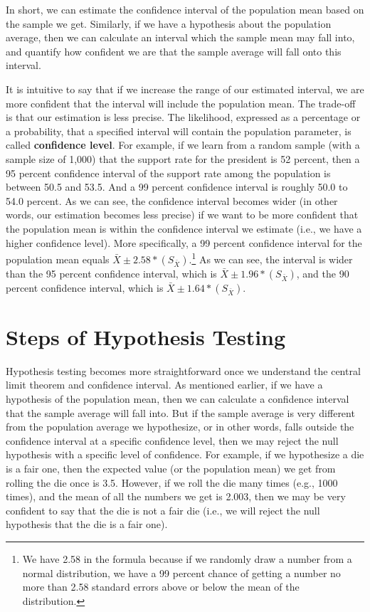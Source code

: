 \documentclass{book}
\begin{document}
In short, we can estimate the confidence interval of the population mean based
on the sample we get. Similarly, if we have a hypothesis about the population
average, then we can calculate an interval which the sample mean may fall
into, and quantify how confident we are that the sample average will fall onto
this interval.

It is intuitive to say that if we increase the range of our estimated
interval, we are more confident that the interval will include the population
mean. The trade-off is that our estimation is less precise. The likelihood,
expressed as a percentage or a probability, that a specified interval will
contain the population parameter, is called \textbf{confidence level}. For
example, if we learn from a random sample (with a sample size of 1,000) that
the support rate for the president is 52 percent, then a 95 percent confidence
interval of the support rate among the population is between 50.5 and 53.5.
And a 99 percent confidence interval is roughly 50.0 to 54.0 percent. As we
can see, the confidence interval becomes wider (in other words, our estimation
becomes less precise) if we want to be more confident that the population mean
is within the confidence interval we estimate (i.e., we have a higher
confidence level). More specifically, a 99 percent confidence interval for the
population mean equals \(\bar{X}\pm 2.58 * (S_{\bar{X}})\).\footnote{We have
  2.58 in the formula because if we randomly draw a number from a normal
  distribution, we have a 99 percent chance of getting a number no more than
  2.58 standard errors above or below the mean of the distribution.} As we can
see, the interval is wider than the 95 percent confidence interval, which is
\(\bar{X}\pm 1.96 * (S_{\bar{X}})\), and the 90 percent confidence interval,
which is \(\bar{X}\pm 1.64 * (S_{\bar{X}})\).

\hypertarget{steps-of-hypothesis-testing}{%
\section{Steps of Hypothesis Testing}\label{steps-of-hypothesis-testing}}

Hypothesis testing becomes more straightforward once we understand the central
limit theorem and confidence interval. As mentioned earlier, if we have a
hypothesis of the population mean, then we can calculate a confidence interval
that the sample average will fall into. But if the sample average is very
different from the population average we hypothesize, or in other words, falls
outside the confidence interval at a specific confidence level, then we may
reject the null hypothesis with a specific level of confidence. For example,
if we hypothesize a die is a fair one, then the expected value (or the
population mean) we get from rolling the die once is 3.5. However, if we roll
the die many times (e.g., 1000 times), and the mean of all the numbers we get
is 2.003, then we may be very confident to say that the die is not a fair die
(i.e., we will reject the null hypothesis that the die is a fair one).
\end{document}
